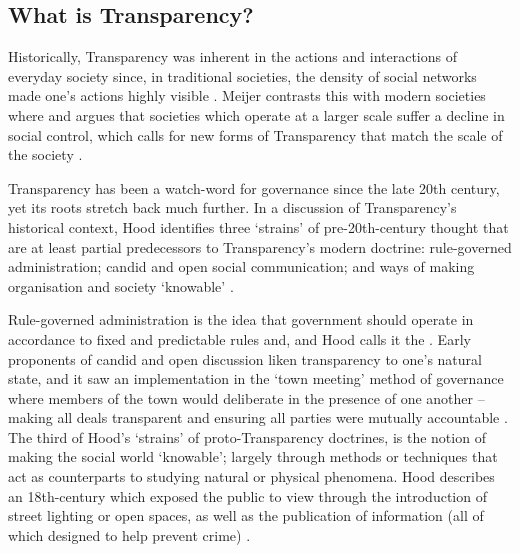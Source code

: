 \subsection{What is Transparency?}
Historically, Transparency was inherent in the actions and interactions of everyday society since, in traditional societies, the density of social networks made one's actions highly visible \cite{meijer_understanding_2009}. Meijer contrasts this with modern societies where  and argues that societies which operate at a larger scale suffer a decline in social control, which calls for new forms of Transparency that match the scale of the society \cite{meijer_understanding_2009}.


Transparency has been a watch-word for governance since the late 20th century, yet its roots stretch back much further. In a discussion of Transparency's historical context, Hood identifies three `strains' of pre-20th-century thought that are at least partial predecessors to Transparency's modern doctrine: rule-governed administration; candid and open social communication; and ways of making organisation and society `knowable'  \cite{hood_transparency_2006-1}.

Rule-governed administration is the idea that government should operate in accordance to fixed and predictable rules and, and Hood calls it the  \cite{hood_transparency_2006-1}. Early proponents of candid and open discussion liken transparency to one's natural state, and it saw an implementation in the `town meeting' method of governance where members of the town would deliberate in the presence of one another -- making all deals transparent and ensuring all parties were mutually accountable \cite{hood_transparency_2006-1}. The third of Hood's `strains' of proto-Transparency doctrines, is the notion of making the social world `knowable'; largely through methods or techniques that act as counterparts to studying natural or physical phenomena. Hood describes an 18th-century  which exposed the public to view through the introduction of street lighting or open spaces, as well as the publication of information (all of which designed to help prevent crime) \cite{hood_transparency_2006-1}.


